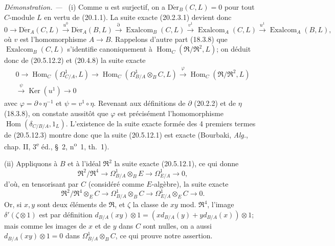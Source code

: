 \documentclass[10pt,oneside]{book}
\newcommand{\oldpage}[2][]{%
  \setcounter{footnote}{0}%
  \marginpar{\scriptsize\textbf{#1}~|~#2}\ignorespaces}
\newenvironment{proof}{%
  \par\medskip\noindent\textit{Démonstration. ---\ }}{\par}
\begin{document}
\begin{proof}
\oldpage[0\textsubscript{IV-1}]{134}
(i) Comme $u$ est surjectif, on a $\operatorname{D\acute{e}r}_B(C,L)=0$ pour tout $C$-module
$L$ en vertu de (20.1.1). La suite exacte (20.2.3.1) devient donc
\begin{equation}
\tag{20.5.12.2}
\label{0.20.5.12.2-fr}
  0\longrightarrow\operatorname{D\acute{e}r}_A(C,L)\xrightarrow{u^0}\operatorname{D\acute{e}r}_A(B,L)
  \xrightarrow{\partial}\operatorname{Exalcom}_B(C,L)
  \xrightarrow{v^1}\operatorname{Exalcom}_A(C,L)
  \xrightarrow{u^1}\operatorname{Exalcom}_A(B,L),
\end{equation}
où $v$ est l'homomorphisme $A\to B$. Rappelons d'autre part (18.3.8) que
$\operatorname{Exalcom}_B(C,L)$ s'identifie canoniquement à
$\operatorname{Hom}_C(\mathfrak{R}/\mathfrak{R}^2,L)$; on déduit donc de (20.5.12.2)
et (20.4.8) la suite exacte
\begin{equation}
\tag{20.5.12.3}
\label{0.20.5.12.3-fr}
\begin{split}
  0\longrightarrow\operatorname{Hom}_C(\Omega^1_{C/A},L)
  \longrightarrow\operatorname{Hom}_C(\Omega^1_{B/A}\otimes_B C,L)
  \xrightarrow{\varphi}\operatorname{Hom}_C(\mathfrak{R}/\mathfrak{R}^2,L)\\
  \xrightarrow{\psi}\operatorname{Ker}(u^1)\longrightarrow 0
\end{split}
\end{equation}
avec $\varphi=\partial\circ\eta^{-1}$ et $\psi=v^1\circ\eta$. Revenant
aux définitions de $\partial$ (20.2.2) et de $\eta$ (18.3.8), on constate
aussitôt que $\varphi$ est précisément l'homomorphisme
$\operatorname{Hom}(\delta_{C/B/A},1_L)$. L'existence de la suite exacte formée des
4 premiers termes de (20.5.12.3) montre donc que la suite (20.5.12.1)
est exacte (Bourbaki, \emph{Alg.}, chap. II, 3\textsuperscript{e} éd.,
\S~2, n\textsuperscript{o}~1, th.~1).

\medskip
(ii) Appliquons à $B$ et à l'idéal $\mathfrak{R}^2$ la suite exacte
(20.5.12.1), ce qui donne
\begin{equation}
\tag{20.5.12.4}
\label{0.20.5.12.4-fr}
  \mathfrak{R}^2/\mathfrak{R}^4\longrightarrow
  \Omega^1_{B/A}\otimes_B E\longrightarrow\Omega^1_{E/A}\longrightarrow 0,
\end{equation}
d'où, en tensorisant par $C$ (considéré comme $E$-algèbre), la suite
exacte
\[
  \mathfrak{R}^2/\mathfrak{R}^4\otimes_E C\longrightarrow
  \Omega^1_{B/A}\otimes_B C\longrightarrow
  \Omega^1_{E/A}\otimes_E C\longrightarrow 0.
\]
Or, si $x,y$ sont deux éléments de $\mathfrak{R}$, et $\zeta$ la classe
de $xy$ mod. $\mathfrak{R}^4$, l'image
$\delta'(\zeta\otimes1)$ est par définition
$d_{B/A}(xy)\otimes1=(xd_{B/A}(y)+yd_{B/A}(x))\otimes1$; mais comme les
images de $x$ et de $y$ dans $C$ sont nulles, on a aussi
$d_{B/A}(xy)\otimes1=0$ dans $\Omega^1_{B/A}\otimes_B C$, ce qui prouve
notre assertion.


\end{proof}
\end{document}
